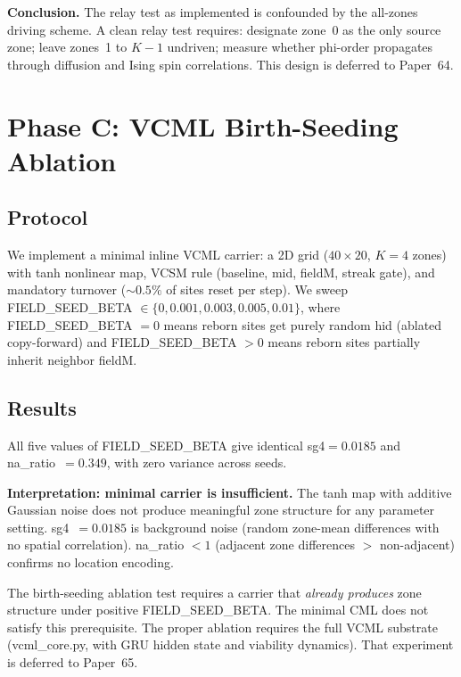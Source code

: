 \documentclass[12pt,a4paper]{article}
\begin{document}
\textbf{Conclusion.}
The relay test as implemented is confounded by the all-zones driving scheme.
A clean relay test requires: designate zone~0 as the only source zone;
leave zones~1 to $K-1$ undriven; measure whether phi-order propagates through
diffusion and Ising spin correlations.
This design is deferred to Paper~64.

\section{Phase C: VCML Birth-Seeding Ablation}
\label{sec:phaseC}

\subsection{Protocol}

We implement a minimal inline VCML carrier: a 2D grid ($40 \times 20$, $K=4$ zones)
with tanh nonlinear map, VCSM rule (baseline, mid, fieldM, streak gate), and
mandatory turnover ($\sim 0.5\%$ of sites reset per step).
We sweep FIELD\_SEED\_BETA $\in \{0, 0.001, 0.003, 0.005, 0.01\}$, where
FIELD\_SEED\_BETA $= 0$ means reborn sites get purely random hid (ablated copy-forward)
and FIELD\_SEED\_BETA $> 0$ means reborn sites partially inherit neighbor fieldM.

\subsection{Results}

All five values of FIELD\_SEED\_BETA give identical sg4$= 0.0185$ and
na\_ratio~$= 0.349$, with zero variance across seeds.

\textbf{Interpretation: minimal carrier is insufficient.}
The tanh map with additive Gaussian noise does not produce meaningful zone structure
for any parameter setting.
sg4~$= 0.0185$ is background noise (random zone-mean differences with no spatial correlation).
na\_ratio $< 1$ (adjacent zone differences $>$ non-adjacent) confirms no location encoding.

The birth-seeding ablation test requires a carrier that \emph{already produces}
zone structure under positive FIELD\_SEED\_BETA.
The minimal CML does not satisfy this prerequisite.
The proper ablation requires the full VCML substrate (vcml\_core.py,
with GRU hidden state and viability dynamics).
That experiment is deferred to Paper~65.
\end{document}
